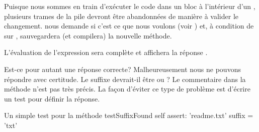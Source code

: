 \documentclass[a4paper,10pt,twoside]{book}
\begin{document}
Puisque nous sommes en train d'exécuter le code dans un bloc à
l'intérieur d'un , plusieurs trames de la pile 
devront être abandonnées de manière à valider le changement.
\pharo nous demande si c'est ce que nous voulons (voir )
et, à condition de \click{} sur , \pharo sauvegardera
(et compilera) la nouvelle méthode.


L'évaluation de l'expression  sera complète et affichera la réponse .

Est-ce pour autant une réponse correcte?  Malheureusement nous ne pouvons répondre avec certitude.
Le suffixe devrait-il être  ou ?
Le commentaire dans la méthode  n'est pas très précis.
La façon d'éviter ce type de problème est d'écrire un test  pour définir la réponse.

\begin{method}[testSuffix]{Un simple test pour la méthode }
testSuffixFound
	self assert: 'readme.txt' suffix = 'txt'
\end{method}
\end{document}
